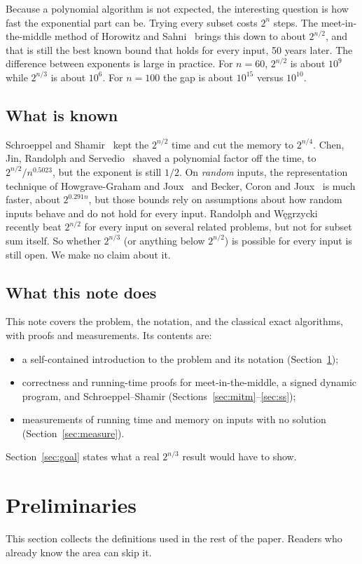 \documentclass[conference]{IEEEtran}
\begin{document}
Because a polynomial algorithm is not expected, the interesting question is
how fast the exponential part can be. Trying every subset costs $2^n$ steps.
The meet-in-the-middle method of Horowitz and Sahni~\cite{hs} brings this down
to about $2^{n/2}$, and that is still the best known bound that holds for
every input, 50 years later. The difference between exponents is large in
practice. For $n=60$, $2^{n/2}$ is about $10^9$ while $2^{n/3}$ is about
$10^6$. For $n=100$ the gap is about $10^{15}$ versus $10^{10}$.

\subsection{What is known}
Schroeppel and Shamir~\cite{ss} kept the $2^{n/2}$ time and cut the memory to
$2^{n/4}$. Chen, Jin, Randolph and Servedio~\cite{chen} shaved a polynomial
factor off the time, to $2^{n/2}/n^{0.5023}$, but the exponent is still $1/2$.
On \emph{random} inputs, the representation technique of
Howgrave-Graham and Joux~\cite{hgj} and Becker, Coron and Joux~\cite{bcj} is
much faster, about $2^{0.291n}$, but those bounds rely on assumptions about how
random inputs behave and do not hold for every input. Randolph and
W\k{e}grzycki~\cite{rw} recently beat $2^{n/2}$ for every input on several
related problems, but not for subset sum itself. So whether $2^{n/3}$ (or
anything below $2^{n/2}$) is possible for every input is still open. We make no
claim about it.

\subsection{What this note does}
This note covers the problem, the notation, and the classical exact
algorithms, with proofs and measurements. Its contents are:
\begin{itemize}
\item a self-contained introduction to the problem and its notation
(Section~\ref{sec:prelim});
\item correctness and running-time proofs for meet-in-the-middle, a signed
dynamic program, and Schroeppel--Shamir
(Sections~\ref{sec:mitm}--\ref{sec:ss});
\item measurements of running time and memory on inputs with no solution
(Section~\ref{sec:measure}).
\end{itemize}
Section~\ref{sec:goal} states what a real $2^{n/3}$ result would have to show.

\section{Preliminaries}\label{sec:prelim}
This section collects the definitions used in the rest of the paper. Readers
who already know the area can skip it.
\end{document}

